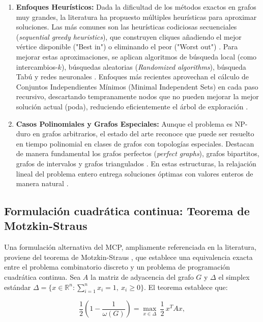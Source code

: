 \begin{enumerate}
    \item \textbf{Enfoques Heurísticos:} Dada la dificultad de los métodos exactos en grafos muy grandes, la literatura ha propuesto múltiples heurísticas para aproximar soluciones. Las más comunes son las heurísticas codiciosas secuenciales (\textit{sequential greedy heuristics}), que construyen cliques añadiendo el mejor vértice disponible ("Best in") o eliminando el peor ("Worst out") \parencite{pardalos1994maximum}. Para mejorar estas aproximaciones, se aplican algoritmos de búsqueda local (como intercambios-$k$), búsquedas aleatorias (\textit{Randomized algorithms}), búsqueda Tabú y redes neuronales \parencite{pardalos1994maximum}. Enfoques más recientes aprovechan el cálculo de Conjuntos Independientes Mínimos (Minimal Independent Sets) en cada paso recursivo, descartando tempranamente nodos que no pueden mejorar la mejor solución actual (poda), reduciendo eficientemente el árbol de exploración \parencite{singh2014_simple}.

    \item \textbf{Casos Polinomiales y Grafos Especiales:} Aunque el problema es NP-duro en grafos arbitrarios, el estado del arte reconoce que puede ser resuelto en tiempo polinomial en clases de grafos con topologías especiales. Destacan de manera fundamental los grafos perfectos (\textit{perfect graphs}), grafos bipartitos, grafos de intervalos y grafos triangulados \parencite{pardalos1994maximum}. En estas estructuras, la relajación lineal del problema entero entrega soluciones óptimas con valores enteros de manera natural \parencite{pardalos1994maximum}.
\end{enumerate}

\subsection{Formulación cuadrática continua: Teorema de Motzkin-Straus}\label{subsec:motzkin}

Una formulación alternativa del MCP, ampliamente referenciada en la literatura, proviene del teorema de Motzkin-Straus \parencite{motzkin1965}, que establece una equivalencia exacta entre el problema combinatorio discreto y un problema de programación cuadrática continua. Sea $A$ la matriz de adyacencia del grafo $G$ y $\Delta$ el simplex estándar $\Delta = \{x \in \mathbb{R}^n : \sum_{i=1}^{n} x_i = 1,\ x_i \geq 0\}$. El teorema establece que:

\begin{equation}\label{eq:motzkin}
    \frac{1}{2}\left(1 - \frac{1}{\omega(G)}\right) = \max_{x \in \Delta}\ \frac{1}{2}\, x^T A x,
\end{equation}


